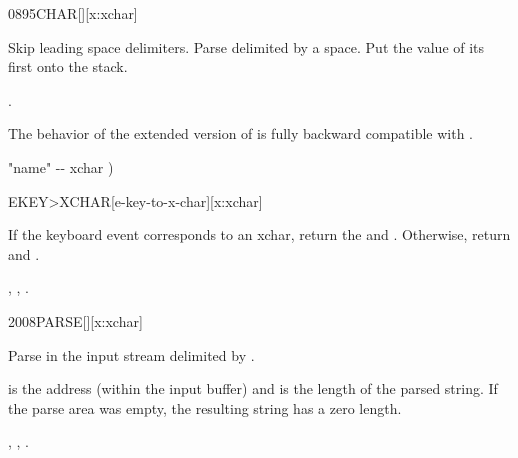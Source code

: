 \begin{worddef*}{0895}{CHAR}[][x:xchar]
\item {}

	Skip leading space delimiters.  Parse  delimited by a space.
	Put the value of its first  onto the stack.

\see {}.

	\begin{rationale}
		The behavior of the extended version of  is fully backward
		compatible with .
	\end{rationale}

	\begin{implement}
	\word{:}   "name" -{}- xchar )
		      \word{;}
	\end{implement}
\end{worddef*}


\begin{worddef*}[EKEYtoXCHAR]{}{EKEY>XCHAR}[e-key-to-x-char][x:xchar]
\item {}

	If the keyboard event  corresponds to an xchar, return the
	 and .  Otherwise, return  and
	.

\see {},
	,
	.
\end{worddef*}


\begin{worddef*}{2008}{PARSE}[][x:xchar]
\item {}

  Parse  in the input stream delimited by .

	 is the address (within the input buffer) and 
	is the length of the parsed string. If the parse area was empty, the
	resulting string has a zero length.

\see {},
	,
	.
\end{worddef*}


